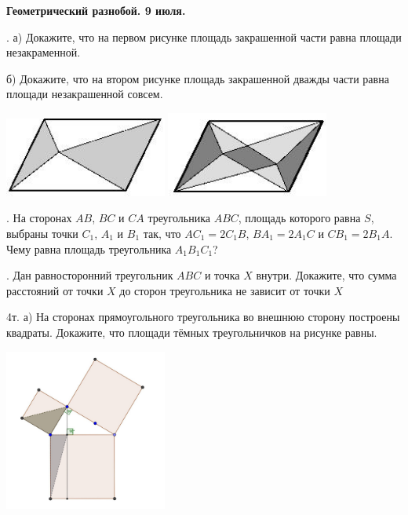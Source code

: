 \begin{center}
\Large
\textbf{Геометрический разнобой. 9 июля. }
\end{center}  

\bigskip

. а) Докажите, что на первом рисунке площадь закрашенной части равна площади незакраменной.


б) Докажите, что на втором рисунке площадь закрашенной дважды части равна площади незакрашенной совсем.

\begin{center}

\includegraphics[width=0.4\textwidth]{2b.JPG}
\includegraphics[width=0.4\textwidth]{2d.JPG}
\end{center}


. На сторонах $AB$, $BC$ и $CA$ треугольника $ABC$, площадь которого равна $S$, выбраны точки $C_1$, $A_1$ и $B_1$ так, что $AC_1 = 2C_1B$, $BA_1=2A_1C$ и $CB_1=2B_1A$. Чему равна площадь треугольника $A_1B_1C_1$? 


. Дан равносторонний треугольник $ABC$ и точка $X$ внутри. Докажите, что сумма расстояний от точки $X$ до сторон треугольника не зависит от точки $X$

\q4т. а) На сторонах прямоугольного треугольника во внешнюю сторону построены квадраты. Докажите, что площади тёмных треугольничков на рисунке равны.\\

\begin{center}
\includegraphics[width=0.4\textwidth]{pifagor.jpg}
\end{center} 


